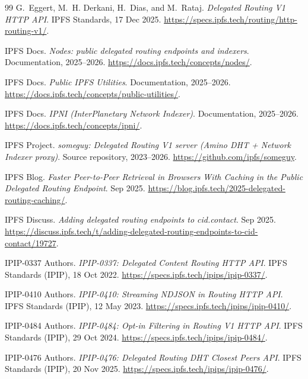 \documentclass[11pt]{article}
\begin{document}
\begin{thebibliography}{99}
G.~Eggert, M.~H. Derkani, H.~Dias, and M.~Rataj.
\newblock \emph{Delegated Routing V1 HTTP API}.
\newblock IPFS Standards, 17 Dec 2025.
\newblock \url{https://specs.ipfs.tech/routing/http-routing-v1/}.

IPFS Docs.
\newblock \emph{Nodes: public delegated routing endpoints and indexers}.
\newblock Documentation, 2025--2026.
\newblock \url{https://docs.ipfs.tech/concepts/nodes/}.

IPFS Docs.
\newblock \emph{Public IPFS Utilities}.
\newblock Documentation, 2025--2026.
\newblock \url{https://docs.ipfs.tech/concepts/public-utilities/}.

IPFS Docs.
\newblock \emph{IPNI (InterPlanetary Network Indexer)}.
\newblock Documentation, 2025--2026.
\newblock \url{https://docs.ipfs.tech/concepts/ipni/}.

IPFS Project.
\newblock \emph{someguy: Delegated Routing V1 server (Amino DHT + Network Indexer proxy)}.
\newblock Source repository, 2023--2026.
\newblock \url{https://github.com/ipfs/someguy}.

IPFS Blog.
\newblock \emph{Faster Peer-to-Peer Retrieval in Browsers With Caching in the Public Delegated Routing Endpoint}.
 Sep 2025.
\newblock \url{https://blog.ipfs.tech/2025-delegated-routing-caching/}.

IPFS Discuss.
\newblock \emph{Adding delegated routing endpoints to cid.contact}.
 Sep 2025.
\newblock \url{https://discuss.ipfs.tech/t/adding-delegated-routing-endpoints-to-cid-contact/19727}.


IPIP-0337 Authors.
\newblock \emph{IPIP-0337: Delegated Content Routing HTTP API}.
\newblock IPFS Standards (IPIP), 18 Oct 2022.
\newblock \url{https://specs.ipfs.tech/ipips/ipip-0337/}.


IPIP-0410 Authors.
\newblock \emph{IPIP-0410: Streaming NDJSON in Routing HTTP API}.
\newblock IPFS Standards (IPIP), 12 May 2023.
\newblock \url{https://specs.ipfs.tech/ipips/ipip-0410/}.


IPIP-0484 Authors.
\newblock \emph{IPIP-0484: Opt-in Filtering in Routing V1 HTTP API}.
\newblock IPFS Standards (IPIP), 29 Oct 2024.
\newblock \url{https://specs.ipfs.tech/ipips/ipip-0484/}.


IPIP-0476 Authors.
\newblock \emph{IPIP-0476: Delegated Routing DHT Closest Peers API}.
\newblock IPFS Standards (IPIP), 20 Nov 2025.
\newblock \url{https://specs.ipfs.tech/ipips/ipip-0476/}.



\end{thebibliography}
\end{document}
